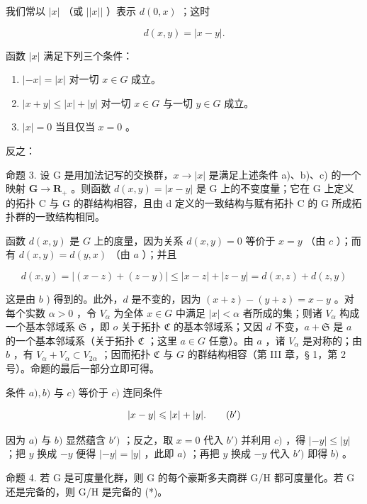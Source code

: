 我们常以 \(|x|\) （或 \(||x||\) ）表示 \(d(0, x)\) ；这时

\[
d (x, y) = | x - y |.
\]

函数 \(|x|\) 满足下列三个条件：

\begin{enumerate}
\def\labelenumi{\alph{enumi})}
\item
  \(|-x| = |x|\) 对一切 \(x \in G\) 成立。
\item
  \(|x + y| \leqslant |x| + |y|\) 对一切 \(x \in G\) 与一切 \(y \in G\) 成立。
\item
  \(|x| = 0\) 当且仅当 \(x = 0\) 。
\end{enumerate}

反之：

命题 3. 设 G 是用加法记写的交换群，\(x \to |x|\) 是满足上述条件 a)、b)、c) 的一个映射 \(\mathbf{G} \to \mathbf{R}_+\) 。则函数 \(d(x, y) = |x - y|\) 是 G 上的不变度量；它在 G 上定义的拓扑 C 与 G 的群结构相容，且由 d 定义的一致结构与赋有拓扑 C 的 G 所成拓扑群的一致结构相同。

函数 \(d(x, y)\) 是 \(G\) 上的度量，因为关系 \(d(x, y) = 0\) 等价于 \(x = y\) （由 \(c\) ）；而有 \(d(x, y) = d(y, x)\) （由 \(a\) ）；并且

\[
d (x, y) = | (x - z) + (z - y) | \leqslant | x - z | + | z - y | = d (x, z) + d (z, y)
\]

这是由 \(b\) ) 得到的。此外，\(d\) 是不变的，因为 \((x + z) - (y + z) = x - y\) 。对每个实数 \(\alpha > 0\) ，令 \(V_{\alpha}\) 为全体 \(x \in G\) 中满足 \(|x| < \alpha\) 者所成的集；则诸 \(V_{\alpha}\) 构成一个基本邻域系 \(\mathfrak{S}\) ，即 \(o\) 关于拓扑 \(\mathfrak{C}\) 的基本邻域系；又因 \(d\) 不变，\(a + \mathfrak{S}\) 是 \(a\) 的一个基本邻域系（关于拓扑 \(\mathfrak{C}\) ；这里 \(a \in G\) 任意）。由 \(a\) ，诸 \(V_{\alpha}\) 是对称的；由 \(b\) ，有 \(V_{\alpha} + V_{\alpha} \subset V_{2\alpha}\) ；因而拓扑 \(\mathfrak{C}\) 与 \(G\) 的群结构相容（第 III 章，§ 1，第 2 号）。命题的最后一部分立即可得。

条件 \(a), b)\) 与 \(c)\) 等价于 \(c)\) 连同条件

\[
| x - y | \leqslant | x | + | y |.\tag{\(b^{\prime}\)}
\]

因为 \(a)\) 与 \(b)\) 显然蕴含 \(b')\) ；反之，取 \(x = 0\) 代入 \(b')\) 并利用 \(c)\) ，得 \(|-y| \leqslant |y|\) ；把 \(y\) 换成 \(-y\) 便得 \(|-y| = |y|\) ，此即 \(a)\) ；再把 \(y\) 换成 \(-y\) 代入 \(b')\) 即得 \(b)\) 。

命题 4. 若 G 是可度量化群，则 G 的每个豪斯多夫商群 G/H 都可度量化。若 G 还是完备的，则 G/H 是完备的 (*)。

